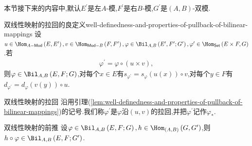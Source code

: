 本节接下来的内容中,默认$E^{\prime}$是左$A$-模,$F^{\prime}$是右$B$-模,$G^{\prime}$是$\left(A,B\right)$-双模.

\begin{lemma}{双线性映射的拉回的良定义}{well-definedness-and-properties-of-pullback-of-bilinear-mappings}
	设$u\in\Hom_{A-\mathsf{Mod}}\left(E,E^{\prime}\right),v\in\Hom_{\mathsf{Mod}-B}\left(F,F^{\prime}\right),\varphi\in\Bil_{A,B}\left(E^{\prime},F^{\prime};G^{\prime}\right),\varphi^{\prime}\in\Hom_{\mathsf{Set}}\left(E\times F,G\right)$.若
	\begin{align*}
		\varphi^{\prime}=\varphi\circ\left(u\times v\right),
	\end{align*}
	则$\varphi\in\Bil_{A,B}\left(E,F;G\right)$,对每个$x\in E$有$s_{\varphi^{\prime}}=s_{\varphi}\left(u\left(x\right)\right)\circ v$,对每个$y\in F$有$d_{\varphi^{\prime}}=d_{\varphi}\left(v\left(y\right)\right)\circ u$.
\end{lemma}

\begin{definition}{双线性映射的拉回}{}
	沿用引理(\ref{lem:well-definedness-and-properties-of-pullback-of-bilinear-mappings})的记号.我们称$\varphi^{\prime}$是$\varphi$沿$\left(u,v\right)$的拉回,并把$\varphi^{\prime}$记作$\varphi_{\ast}$.
\end{definition}

\begin{proposition}{双线性映射的前推}{}
	设$\varphi\in\Bil_{A,B}\left(E,F;G\right),h\in\Hom_{\left(A,B\right)}\left(G,G^{\prime}\right)$,则$h\circ\varphi\in\Bil_{A,B}\left(E,F;G^{\prime}\right)$.
\end{proposition}
















